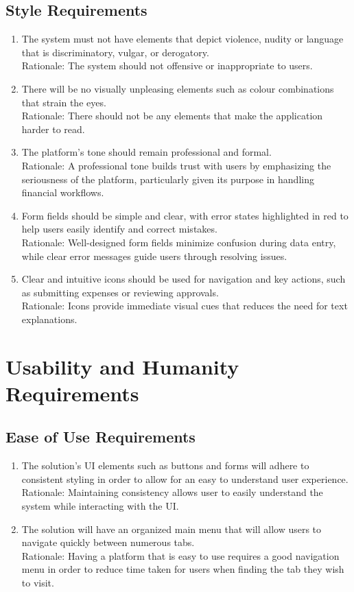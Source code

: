 \documentclass[12pt]{article}
\begin{document}
\subsection{Style Requirements}
\begin{enumerate}
  \item The system must not have elements that depict violence, nudity or language that is discriminatory, vulgar, or derogatory. \\ 
  Rationale: The system should not offensive or inappropriate to users.
  \item There will be no visually unpleasing elements such as colour combinations that strain the eyes. \\ 
  Rationale: There should not be any elements that make the application harder to read.
  \item The platform's tone should remain professional and formal. \\
  Rationale: A professional tone builds trust with users by emphasizing the seriousness of the platform, particularly given its purpose in handling financial workflows.
  \item Form fields should be simple and clear, with error states highlighted in red to help users easily identify and correct mistakes. \\
  Rationale: Well-designed form fields minimize confusion during data entry, while clear error messages guide users through resolving issues.
  \item Clear and intuitive icons should be used for navigation and key actions, such as submitting expenses or reviewing approvals. \\
  Rationale: Icons provide immediate visual cues that reduces the need for text explanations.
\end{enumerate}

\section{Usability and Humanity Requirements}
\subsection{Ease of Use Requirements}

\begin{enumerate}
  
  \item The solution's UI elements such as buttons and forms will adhere to consistent styling in order to allow for an easy to understand user experience. \\
  Rationale: Maintaining consistency allows user to easily understand the system while interacting with the UI.
  \item The solution will have an organized main menu that will allow users to navigate quickly between numerous tabs. \\
  Rationale: Having a platform that is easy to use requires a good navigation menu in order to reduce time taken for users when finding the tab they wish to visit.
\end{enumerate}
\end{document}
